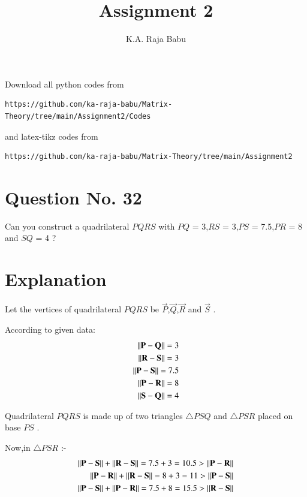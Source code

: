 \documentclass[journal,12pt,twocolumn]{IEEEtran}
\begin{document}
     \def\rightbox#1{\makebox[0in][r]{#1}}
     \def\centbox#1{\makebox[0in]{#1}}
     \def\topbox#1{\raisebox{-\baselineskip}[0in][0in]{#1}}
     \def\midbox#1{\raisebox{-0.5\baselineskip}[0in][0in]{#1}}
\vspace{3cm}
\title{Assignment 2}
\author{K.A. Raja Babu}
\maketitle
\newpage
\bigskip
\renewcommand{\thefigure}{\theenumi}
\renewcommand{\thetable}{\theenumi}
Download all python codes from 
\begin{lstlisting}
https://github.com/ka-raja-babu/Matrix-Theory/tree/main/Assignment2/Codes
\end{lstlisting}
%
and latex-tikz codes from 
%
\begin{lstlisting}
https://github.com/ka-raja-babu/Matrix-Theory/tree/main/Assignment2
\end{lstlisting}
%
\section{Question No. 32}
Can you construct a quadrilateral $PQRS$ with $PQ$ = 3,$RS$ = 3,$PS$ = 7.5,$PR$ = 8 and $SQ$ = 4 ?
%

\section{Explanation}
Let the vertices of quadrilateral $PQRS$ be $\vec{P}$,$\vec{Q}$,$\vec{R}$ and $\vec{S}$ .

According to given data:
\begin{align}
\left\lVert\mathbf{P}-\mathbf{Q}\right\rVert = 3
\\
\left\lVert\mathbf{R}-\mathbf{S}\right\rVert = 3
\\
\left\lVert\mathbf{P}-\mathbf{S}\right\rVert = 7.5
\\
\left\lVert\mathbf{P}-\mathbf{R}\right\rVert = 8
\\
\left\lVert\mathbf{S}-\mathbf{Q}\right\rVert = 4
\end{align}

Quadrilateral $PQRS$ is made up of two triangles $\triangle PSQ$ and $\triangle PSR$ placed on base $PS$ .

Now,in $\triangle PSR$ :-
\begin{align}
\left\lVert\mathbf{P}-\mathbf{S}\right\rVert + \left\lVert\mathbf{R}-\mathbf{S}\right\rVert = 7.5 + 3 =10.5 > \left\lVert\mathbf{P}-\mathbf{R}\right\rVert
\\
\left\lVert\mathbf{P}-\mathbf{R}\right\rVert + \left\lVert\mathbf{R}-\mathbf{S}\right\rVert = 8 + 3 =11 > \left\lVert\mathbf{P}-\mathbf{S}\right\rVert
\\
\left\lVert\mathbf{P}-\mathbf{S}\right\rVert + \left\lVert\mathbf{P}-\mathbf{R}\right\rVert = 7.5 + 8 =15.5 > \left\lVert\mathbf{R}-\mathbf{S}\right\rVert
\end{align}
\end{document}
